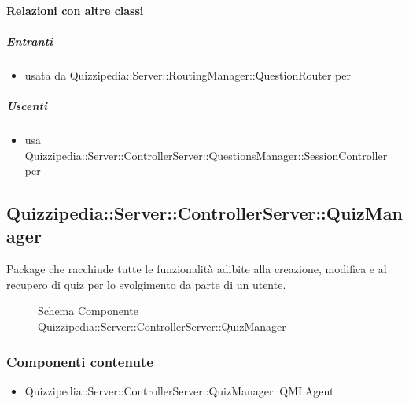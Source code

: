 \paragraph{Relazioni con altre classi}
\subparagraph{Entranti}
\begin{itemize}
\item usata da Quizzipedia::Server::RoutingManager::QuestionRouter per 
\end{itemize}
\subparagraph{Uscenti}
\begin{itemize}
\item usa Quizzipedia::Server::ControllerServer::QuestionsManager::SessionController per 
\end{itemize}
\subsection{Quizzipedia::Server::ControllerServer::QuizManager}
Package che racchiude tutte le funzionalità adibite alla creazione, modifica e al recupero di quiz per lo svolgimento da parte di un utente.
\begin{figure}[H]
\centering
\noindent{}
\caption[Schema Componente Quizzipedia::Server::ControllerServer::QuizManager]{Schema Componente Quizzipedia::Server::ControllerServer::QuizManager}
\end{figure}
\subsubsection{Componenti contenute}
\begin{itemize}
\item Quizzipedia::Server::ControllerServer::QuizManager::QMLAgent
\end{itemize}
